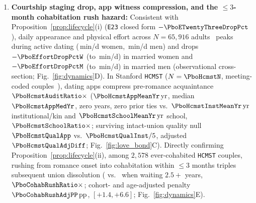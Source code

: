 \begin{enumerate}[leftmargin=1.4em,itemsep=1.5pt,topsep=2pt]
\item \textbf{Courtship staging drop, app witness compression, and the $\le 3$-month cohabitation rush hazard:} Consistent with Proposition~\ref{prop:lifecycle}(i) (\texttt{E23} closed form $-\PboETwentyThreeDropPct$), daily appearance and physical effort across $N=65{,}916$ adults~\cite{kowal2025} peaks during active dating (\PboEffortDatingW\,min/d women, \PboEffortDatingM\,min/d men) and drops $-\PboEffortDropPctW$ (to \PboEffortMarriedW\,min/d) in married women and $-\PboEffortDropPctM$ (to \PboEffortMarriedM\,min/d) in married men (observational cross-section; Fig.~\ref{fig:dynamics}D). In Stanford \texttt{HCMST} ($N=\PboHcmstN$, \PboHcmstCouplesN{} meeting-coded couples~\cite{rosenfeld2019}), dating apps compress pre-romance acquaintance $\PboHcmstAuditRatio\times$ ($\PboHcmstAppMeanYr\,\mathrm{yr}$, median $\PboHcmstAppMedYr$, \PboHcmstAppZeroPct{} zero years, \PboHcmstAppZeroTiePct{} zero prior ties vs.\ $\PboHcmstInstMeanYr\,\mathrm{yr}$ institutional/kin and $\PboHcmstSchoolMeanYr\,\mathrm{yr}$ school, $\PboHcmstSchoolRatio\times$; surviving intact-union quality null $\PboHcmstQualApp$ vs.\ $\PboHcmstQualInst/5$, adjusted $\PboHcmstQualAdjDiff$; Fig.~\ref{fig:love_bond}C). Directly confirming Proposition~\ref{prop:lifecycle}(ii), among $2{,}578$ ever-cohabited \texttt{HCMST} couples, rushing from romance onset into cohabitation within $\le 3$ months triples subsequent union dissolution (\PboCohabRushPct{} vs.\ \PboCohabSlowPct{} when waiting $2.5+$ years, $\PboCohabRushRatio\times$; cohort- and age-adjusted penalty $\PboCohabRushAdjPP\,\mathrm{pp}$, $[+1.4,+6.6]$; Fig.~\ref{fig:dynamics}E).

\end{enumerate}
